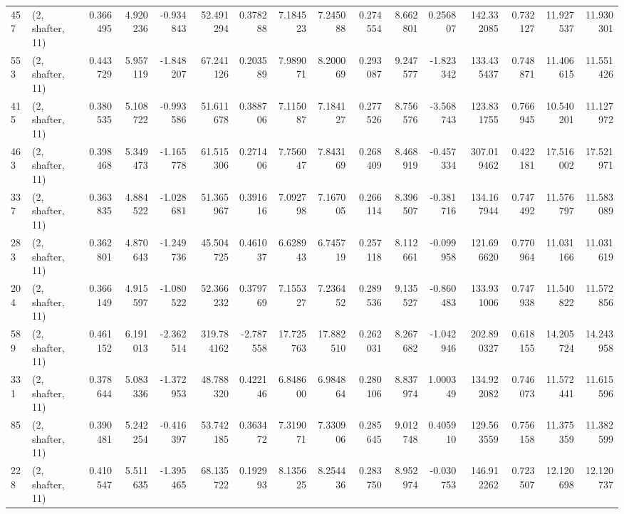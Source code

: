 \begin{tabular}{llrrrrrrrrrrrrrr}
457 &  (2, shafter, 11) &   0.366495 &   4.920236 &  -0.934843 &    52.491294 &   0.378288 &   7.184523 &   7.245088 &  0.274554 &   8.662801 &   0.256807 &    142.332085 &   0.732127 &   11.927537 &   11.930301 \\
553 &  (2, shafter, 11) &   0.443729 &   5.957119 &  -1.848207 &    67.241126 &   0.203589 &   7.989071 &   8.200069 &  0.293087 &   9.247577 &  -1.823342 &    133.435437 &   0.748871 &   11.406615 &   11.551426 \\
415 &  (2, shafter, 11) &   0.380535 &   5.108722 &  -0.993586 &    51.611678 &   0.388706 &   7.115087 &   7.184127 &  0.277526 &   8.756576 &  -3.568743 &    123.831755 &   0.766945 &   10.540201 &   11.127972 \\
463 &  (2, shafter, 11) &   0.398468 &   5.349473 &  -1.165778 &    61.515306 &   0.271406 &   7.756047 &   7.843169 &  0.268409 &   8.468919 &  -0.457334 &    307.019462 &   0.422181 &   17.516002 &   17.521971 \\
337 &  (2, shafter, 11) &   0.363835 &   4.884522 &  -1.028681 &    51.365967 &   0.391616 &   7.092798 &   7.167005 &  0.266114 &   8.396507 &  -0.381716 &    134.167944 &   0.747492 &   11.576797 &   11.583089 \\
283 &  (2, shafter, 11) &   0.362801 &   4.870643 &  -1.249736 &    45.504725 &   0.461037 &   6.628943 &   6.745719 &  0.257118 &   8.112661 &  -0.099958 &    121.696620 &   0.770964 &   11.031166 &   11.031619 \\
204 &  (2, shafter, 11) &   0.366149 &   4.915597 &  -1.080522 &    52.366232 &   0.379769 &   7.155327 &   7.236452 &  0.289536 &   9.135527 &  -0.860483 &    133.931006 &   0.747938 &   11.540822 &   11.572856 \\
589 &  (2, shafter, 11) &   0.461152 &   6.191013 &  -2.362514 &   319.784162 &  -2.787558 &  17.725763 &  17.882510 &  0.262031 &   8.267682 &  -1.042946 &    202.890327 &   0.618155 &   14.205724 &   14.243958 \\
331 &  (2, shafter, 11) &   0.378644 &   5.083336 &  -1.372953 &    48.788320 &   0.422146 &   6.848600 &   6.984864 &  0.280106 &   8.837974 &   1.000349 &    134.922082 &   0.746073 &   11.572441 &   11.615596 \\
85  &  (2, shafter, 11) &   0.390481 &   5.242254 &  -0.416397 &    53.742185 &   0.363472 &   7.319071 &   7.330906 &  0.285645 &   9.012748 &   0.405910 &    129.563559 &   0.756158 &   11.375359 &   11.382599 \\
228 &  (2, shafter, 11) &   0.410547 &   5.511635 &  -1.395465 &    68.135722 &   0.192993 &   8.135625 &   8.254436 &  0.283750 &   8.952974 &  -0.030753 &    146.912262 &   0.723507 &   12.120698 &   12.120737 \\

\end{tabular}
